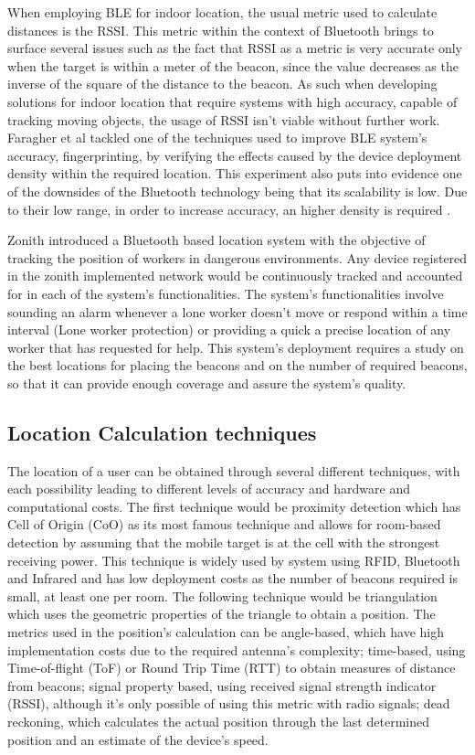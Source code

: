 \documentclass[a4paper]{IEEEtran}
\begin{document}
 
When employing BLE for indoor location, the usual metric used to calculate distances is the RSSI. This metric within the context of Bluetooth brings to surface several issues such as the fact that RSSI as a metric is very accurate only when the target is within a meter of the beacon, since the value decreases as the inverse of the square of the distance to the beacon. As such when developing solutions for indoor location that require systems with high accuracy, capable of tracking moving objects, the usage of RSSI isn't viable without further work. Faragher et al \cite{bleacc} tackled one of the techniques used to improve BLE system's accuracy, fingerprinting, by verifying the effects caused by the device deployment density within the required location. This experiment also puts into evidence one of the downsides of the Bluetooth technology being that its scalability is low. Due to their low range, in order to increase accuracy, an higher density is required . 
 
Zonith \cite{zonith} introduced a Bluetooth based location system with the objective of tracking the position of workers in dangerous environments. Any device registered in the zonith implemented network would be continuously tracked and accounted for in each of the system's functionalities. The system's functionalities involve sounding an alarm whenever a lone worker doesn't move or respond within a time interval (Lone worker protection) or providing a quick a precise location of any worker that has requested for help. This system's deployment requires a study on the best locations for placing the beacons and on the number of required beacons, so that it can provide enough coverage and assure the system's quality. 
 
 
\subsection{Location Calculation techniques} 
\label{subsec:tecnique} 
 
 
The location of a user can be obtained through several different techniques, with each possibility leading to different levels of accuracy and hardware and computational costs. 
The first technique would be proximity detection which has Cell of Origin (CoO) as its most famous technique and allows for room-based detection by assuming that the mobile target is at the cell with the strongest receiving power. This technique is widely used by system using RFID, Bluetooth and Infrared and has low deployment costs as the number of beacons required is small, at least one per room.  
The following technique would be triangulation which uses the geometric properties of the triangle to obtain a position. The metrics used in the position's calculation can be angle-based, which have high implementation costs due to the required antenna's complexity; time-based, using Time-of-flight (ToF) or Round Trip Time (RTT) to obtain measures of distance from beacons; signal property based, using received signal strength indicator (RSSI), although it's only possible of using this metric with radio signals; dead reckoning, which calculates the actual position through the last determined position and an estimate of the device's speed. 
 
\end{document}
